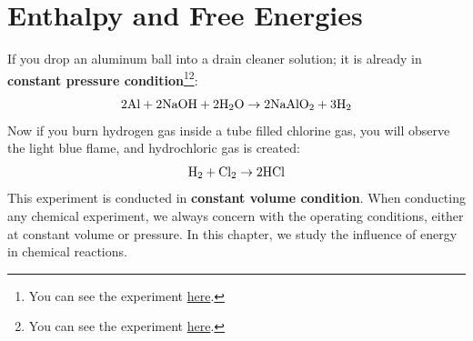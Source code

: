 \documentclass[~/PhyAI/phyai.tex]{subfiles}
\begin{document}
\chapter{Enthalpy and Free Energies}\label{chap:free_energy_and_chemical_thermodynamics} %
If you drop an aluminum ball into a drain cleaner solution; it is already in \textbf{constant pressure condition}\footnote[1]{You can see the experiment \href{https://youtu.be/ynPyhapUHO4?si=fgPUAgjiMcPY7mCX}{here}.}\footnote[2]{You can see the experiment \href{https://youtu.be/MtygiCwnEzw?si=TbpJl7YDPMqVemTx}{here}.}:
$$ 2\ce{Al}+2\ce{NaOH}+2\ce{H2O}\rightarrow 2\ce{NaAlO2}+3\ce{H2} $$
Now if you burn hydrogen gas inside a tube filled chlorine gas, you will observe the light blue flame, and hydrochloric gas is created:
\begin{equation*}
	\ce{H2}+\ce{Cl2}\rightarrow 2\ce{HCl}
\end{equation*}
This experiment is conducted in \textbf{constant volume condition}. When conducting any chemical experiment, we always concern with the operating conditions, either at constant volume or pressure. In this chapter, we study the influence of energy in chemical reactions.
\end{document}

